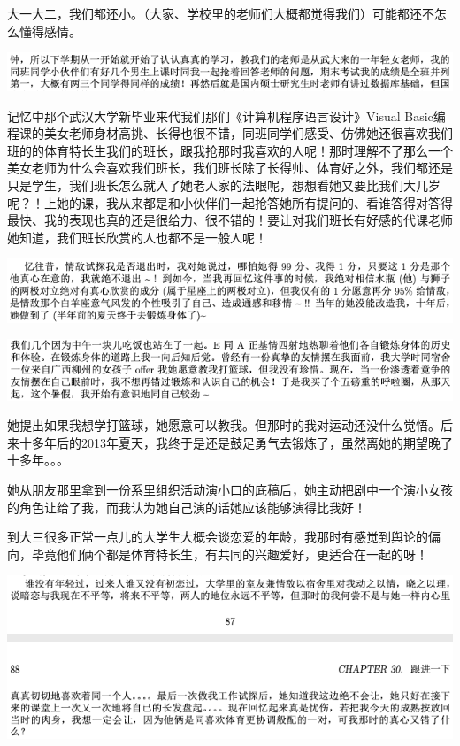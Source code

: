 \documentclass[9pt, b5paper]{article}
\begin{document}
大一大二，我们都还小。（大家、学校里的老师们大概都觉得我们）可能都还不怎么懂得感情。

\begin{center}
\includegraphics[width=.9\linewidth]{./pic/backups_plans_20210422_183816.png}
\end{center}

记忆中那个武汉大学新毕业来代我们那们《计算机程序语言设计》Visual Basic编程课的美女老师身材高挑、长得也很不错，同班同学们感受、仿佛她还很喜欢我们班的的体育特长生我们的班长，跟我抢那时我喜欢的人呢！那时理解不了那么一个美女老师为什么会喜欢我们班长，我们班长除了长得帅、体育好之外，我们都还是只是学生，我们班长怎么就入了她老人家的法眼呢，想想看她又要比我们大几岁呢？！上她的课，我从来都是和小伙伴们一起抢答她所有提问的、看谁答得对答得最快、我的表现也真的还是很给力、很不错的！要让对我们班长有好感的代课老师她知道，我们班长欣赏的人也都不是一般人呢！

\begin{center}
\includegraphics[width=.9\linewidth]{./pic/backups_plans_20210422_103845.png}
\end{center}

\begin{center}
\includegraphics[width=.9\linewidth]{./pic/backups_plans_20210422_184628.png}
\end{center}

她提出如果我想学打篮球，她愿意可以教我。但那时的我对运动还没什么觉悟。后来十多年后的2013年夏天，我终于是还是鼓足勇气去锻炼了，虽然离她的期望晚了十多年。。。

她从朋友那里拿到一份系里组织活动演小口的底稿后，她主动把剧中一个演小女孩的角色让给了我，而我认为她自己演的话她应该能够演得比我好！

到大三很多正常一点儿的大学生大概会谈恋爱的年龄，我那时有感觉到舆论的偏向，毕竟他们俩个都是体育特长生，有共同的兴趣爱好，更适合在一起的呀！

\begin{center}
\includegraphics[width=.9\linewidth]{./pic/backups_plans_20210422_185215.png}
\end{center}
\end{document}

